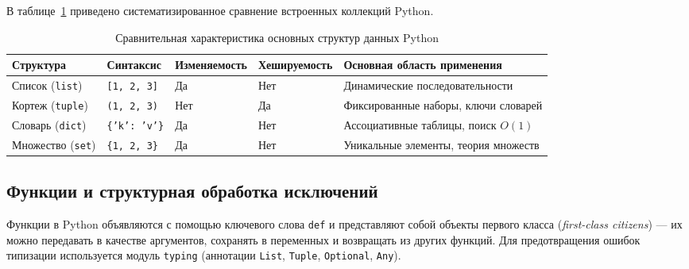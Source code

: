 \documentclass[14pt,a4paper]{extarticle}
\begin{document}
В таблице~\ref{tab:structures_comp} приведено систематизированное сравнение встроенных коллекций Python.

\begin{table}[H]
    \centering
    \caption{Сравнительная характеристика основных структур данных Python}
    \label{tab:structures_comp}
    \small
    \begin{tabularx}{\textwidth}{|>{\raggedright\arraybackslash}p{2.4cm}|>{\raggedright\arraybackslash}p{2.2cm}|>{\centering\arraybackslash}p{2.2cm}|>{\centering\arraybackslash}p{2.2cm}|>{\raggedright\arraybackslash}X|}
        \hline
        \textbf{Структура} & \textbf{Синтаксис} & \textbf{Изменяе\-мость} & \textbf{Хешируе\-мость} & \textbf{Основная область применения} \\
        \hline
        Список (\texttt{list}) & \texttt{[1, 2, 3]} & Да & Нет & Динамические последовательности \\
        \hline
        Кортеж (\texttt{tuple}) & \texttt{(1, 2, 3)} & Нет & Да & Фиксированные наборы, ключи словарей \\
        \hline
        Словарь (\texttt{dict}) & \texttt{\{'k': 'v'\}} & Да & Нет & Ассоциативные таблицы, поиск $O(1)$ \\
        \hline
        Множество (\texttt{set}) & \texttt{\{1, 2, 3\}} & Да & Нет & Уникальные элементы, теория множеств \\
        \hline
    \end{tabularx}
\end{table}

\subsection{Функции и структурная обработка исключений}

Функции в Python объявляются с помощью ключевого слова \texttt{def} и представляют собой объекты первого класса (\textit{first-class citizens}) --- их можно передавать в качестве аргументов, сохранять в переменных и возвращать из других функций. Для предотвращения ошибок типизации используется модуль \texttt{typing} (аннотации \texttt{List}, \texttt{Tuple}, \texttt{Optional}, \texttt{Any}).
\end{document}

